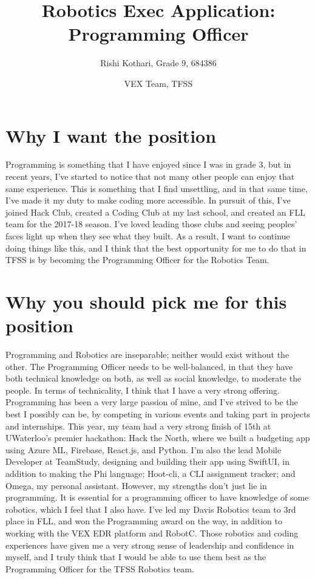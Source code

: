 \documentclass[]{report}
\title{\Huge \textbf{Robotics Exec Application}: Programming Officer}
\author{\LARGE Rishi Kothari, Grade 9, 684386}
\date{VEX Team, TFSS}
\begin{document}
\maketitle
\newpage


\chapter{Why I want the position}

Programming is something that I have enjoyed since I was in grade 3, but in recent years, I've started to notice that not many other people can enjoy that same experience. This is something that I find unsettling, and in that same time, I've made it my duty to make coding more accessible. In pursuit of this, I've joined Hack Club, created a Coding Club at my last school, and created an FLL team for the 2017-18 season. I've loved leading those clubs and seeing peoples' faces light up when they see what they built. As a result, I want to continue doing things like this, and I think that the best opportunity for me to do that in TFSS is by becoming the Programming Officer for the Robotics Team.

\chapter{Why you should pick me for this position}

Programming and Robotics are inseparable; neither would exist without the other. The Programming Officer needs to be well-balanced, in that they have both technical knowledge on both, as well as social knowledge, to moderate the people. In terms of technicality, I think that I have a very strong offering. Programming has been a very large passion of mine, and I've strived to be the best I possibly can be, by competing in various events and taking part in projects and internships. This year, my team had a very strong finish of 15th at UWaterloo's premier hackathon: Hack the North, where we built a budgeting app using Azure ML, Firebase, React.js, and Python. I'm also the lead Mobile Developer at TeamStudy, designing and building their app using SwiftUI, in addition to making the Phi language; Hoot-cli, a CLI assignment tracker; and Omega, my personal assistant. However, my strengths don't just lie in programming. It is essential for a programming officer to have knowledge of some robotics, which I feel that I also have. I've led my Davis Robotics team to 3rd place in FLL, and won the Programming award on the way, in addition to working with the VEX EDR platform and RobotC. Those robotics and coding experiences have given me a very strong sense of leadership and confidence in myself, and I truly think that I would be able to use them best as the Programming Officer for the TFSS Robotics team.
\end{document}
